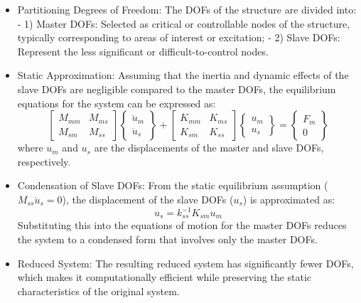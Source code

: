 \documentclass[a4paper, 10pt, conference]{ieeeconf}      %
\begin{document}
\begin{itemize}
    \item Partitioning Degrees of Freedom:
           The DOFs of the structure are divided into: 
           - 1) Master DOFs: Selected as critical or controllable nodes of the structure, typically corresponding to areas of interest or excitation;
           - 2) Slave DOFs: Represent the less significant or difficult-to-control nodes.
    \item Static Approximation:
           Assuming that the inertia and dynamic effects of the slave DOFs are negligible compared to the master DOFs, the equilibrium equations for the system can be expressed as:
           \begin{equation}
                \begin{bmatrix} M_{mm} & M_{ms} \\ M_{sm} & M_{ss} \end{bmatrix} 
                \left\{ \begin{matrix} \ddot{u}_m \\ \ddot{u}_s \end{matrix} \right\}
                + \begin{bmatrix} K_{mm} & K_{ms} \\ K_{sm} & K_{ss} \end{bmatrix}
                \left\{ \begin{matrix} u_m \\ u_s \end{matrix} \right\}
                = \left\{ \begin{matrix} F_m \\0 \end{matrix} \right\}
           \end{equation}
            where $u_m$ and $u_s$ are the displacements of the master and slave DOFs, respectively.
    \item Condensation of Slave DOFs:
            From the static equilibrium assumption ($M_{ss}\ddot{u}_{s} = 0$), the displacement of the slave DOFs ($u_s$) is approximated as:
            \begin{equation}
                u_s = k_{ss}^{-1} K_{sm} u_m
            \end{equation}
            Substituting this into the equations of motion for the master DOFs reduces the system to a condensed form that involves only the master DOFs.
    \item Reduced System:
            The resulting reduced system has significantly fewer DOFs, which makes it computationally efficient while preserving the static characteristics of the original system.
\end{itemize}
\end{document}
